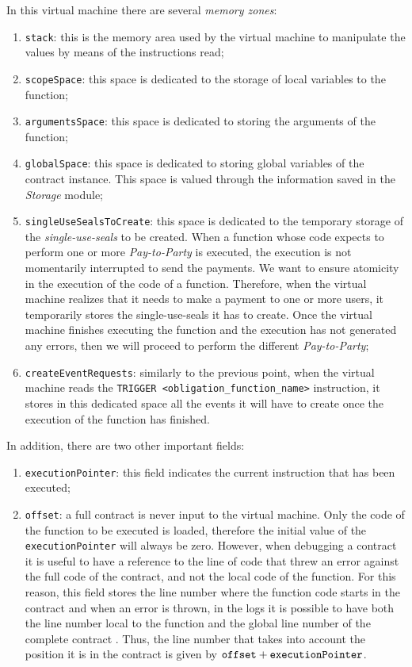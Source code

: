 In this virtual machine there are several \textit{memory zones}:
\begin{enumerate}
  \item \verb|stack|: this is the memory area used by the virtual machine to manipulate the values by 
  means of the instructions read;
  \item \verb|scopeSpace|: this space is dedicated to the storage of local variables to the function;
  \item \verb|argumentsSpace|: this space is dedicated to storing the arguments of the function;
  \item \verb|globalSpace|: this space is dedicated to storing global variables of the contract instance. 
  This space is valued through the information saved in the \textit{Storage} module;
  \item \verb|singleUseSealsToCreate|: this space is dedicated to the temporary storage of the 
  \textit{single-use-seals} to be created. When a function whose code expects to perform one or more 
  \textit{Pay-to-Party} is executed, the execution is not momentarily interrupted to send the payments. We 
  want to ensure atomicity in the execution of the code of a function. Therefore, when the virtual machine 
  realizes that it needs to make a payment to one or more users, it temporarily stores the 
  single-use-seals it has to create. Once the virtual machine finishes executing the function and the 
  execution has not generated any errors, then we will proceed to perform the different 
  \textit{Pay-to-Party};
  \item \verb|createEventRequests|: similarly to the previous point, when the virtual machine reads the 
  \verb|TRIGGER <obligation_function_name>| instruction, it stores in this dedicated space all the events 
  it will have to create once the execution of the function has finished.
\end{enumerate}

In addition, there are two other important fields:
\begin{enumerate}
  \item \verb|executionPointer|: this field indicates the current instruction that has been executed;
  \item \verb|offset|: a full contract is never input to the virtual machine. Only the code of the 
  function to be executed is loaded, therefore the initial value of the \verb|executionPointer| will 
  always be zero. However, when debugging a contract it is useful to have a reference to the line of 
  code that threw an error against the full code of the contract, and not the local code of the function. 
  For this reason, this field stores the line number where the function code starts in the contract and 
  when an error is thrown, in the logs it is possible to have both the line number local to the function 
  and the global line number of the complete contract . Thus, the line number that takes into account the 
  position it is in the contract is given by $\verb|offset| + \verb|executionPointer|$.
\end{enumerate}

